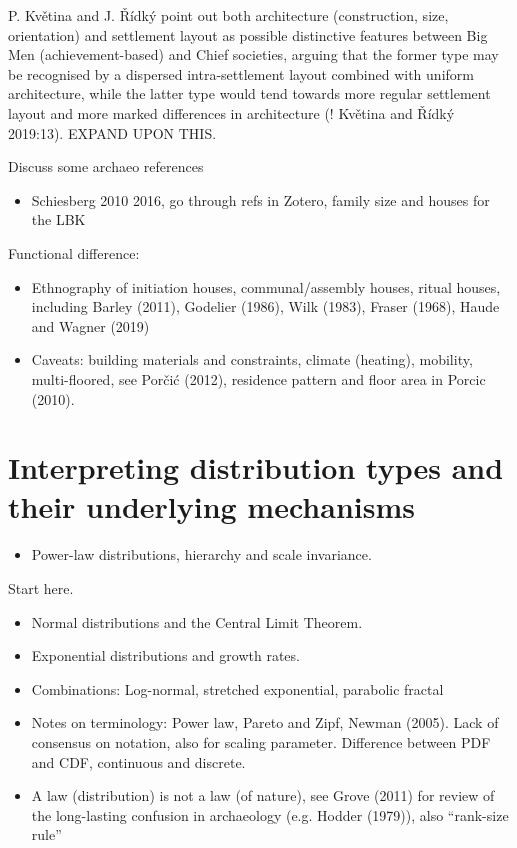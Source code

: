 \documentclass[
  12pt,
]{book}
\providecommand{\tightlist}{%
  \setlength{\itemsep}{0pt}\setlength{\parskip}{0pt}}
\begin{document}
P. Květina and J. Řídký point out both architecture (construction, size, orientation) and settlement layout as possible distinctive features between Big Men (achievement-based) and Chief societies, arguing that the former type may be recognised by a dispersed intra-settlement layout combined with uniform architecture, while the latter type would tend towards more regular settlement layout and more marked differences in architecture (! Květina and Řídký 2019:13). EXPAND UPON THIS.

Discuss some archaeo references

\begin{itemize}
\tightlist
\item
  Schiesberg 2010 2016, go through refs in Zotero, family size and houses for the LBK
\end{itemize}

Functional difference:

\begin{itemize}
\item
  Ethnography of initiation houses, communal/assembly houses, ritual houses, including Barley (2011), Godelier (1986), Wilk (1983), Fraser (1968), Haude and Wagner (2019)
\item
  Caveats: building materials and constraints, climate (heating), mobility, multi-floored, see Porčić (2012), residence pattern and floor area in Porcic (2010).
\end{itemize}

\hypertarget{distributions}{%
\section{Interpreting distribution types and their underlying mechanisms}\label{distributions}}

\begin{itemize}
\tightlist
\item
  Power-law distributions, hierarchy and scale invariance.
\end{itemize}

Start here.

\begin{itemize}
\item
  Normal distributions and the Central Limit Theorem.
\item
  Exponential distributions and growth rates.
\item
  Combinations: Log-normal, stretched exponential, parabolic fractal
\item
  Notes on terminology: Power law, Pareto and Zipf, Newman (2005). Lack of consensus on notation, also for scaling parameter. Difference between PDF and CDF, continuous and discrete.
\item
  A law (distribution) is not a law (of nature), see Grove (2011) for review of the long-lasting confusion in archaeology (e.g. Hodder (1979)), also ``rank-size rule''
\end{itemize}
\end{document}
